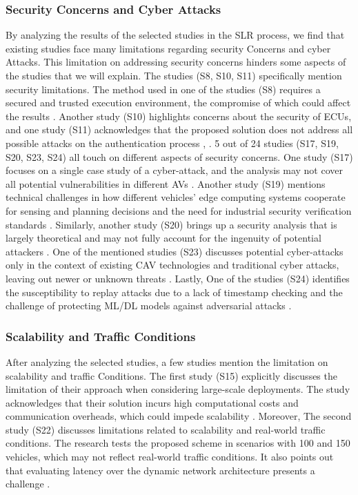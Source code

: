 \documentclass[a4paper,12pt]{article}
\begin{document}
\subsubsection{Security Concerns and Cyber Attacks}
\hspace{5mm} By analyzing the results of the selected studies in the SLR process, we find that existing studies face many limitations regarding security Concerns and cyber Attacks. This limitation on addressing security concerns hinders some aspects of the studies that we will explain. The studies (S8, S10, S11) specifically mention security limitations. The method used in one of the studies (S8) requires a secured and trusted execution environment, the compromise of which could affect the results \cite{s8}. Another study (S10) highlights concerns about the security of ECUs, and one study (S11) acknowledges that the proposed solution does not address all possible attacks on the authentication process \cite{s10}, \cite{s11}. 5 out of 24 studies (S17, S19, S20, S23, S24) all touch on different aspects of security concerns. One study (S17) focuses on a single case study of a cyber-attack, and the analysis may not cover all potential vulnerabilities in different AVs \cite{s17}. Another study (S19) mentions technical challenges in how different vehicles' edge computing systems cooperate for sensing and planning decisions and the need for industrial security verification standards \cite{s19}. Similarly, another study (S20) brings up a security analysis that is largely theoretical and may not fully account for the ingenuity of potential attackers \cite{s20}. One of the mentioned studies (S23) discusses potential cyber-attacks only in the context of existing CAV technologies and traditional cyber attacks, leaving out newer or unknown threats \cite{s23}. Lastly, One of the studies (S24) identifies the susceptibility to replay attacks due to a lack of timestamp checking and the challenge of protecting ML/DL models against adversarial attacks \cite{s24}.

\subsubsection{Scalability and Traffic Conditions}
\hspace{5mm} After analyzing the selected studies, a few studies mention the limitation on scalability and traffic Conditions. The first study (S15) explicitly discusses the limitation of their approach when considering large-scale deployments. The study acknowledges that their solution incurs high computational costs and communication overheads, which could impede scalability \cite{s15}. Moreover, The second study (S22) discusses limitations related to scalability and real-world traffic conditions. The research tests the proposed scheme in scenarios with 100 and 150 vehicles, which may not reflect real-world traffic conditions. It also points out that evaluating latency over the dynamic network architecture presents a challenge \cite{s22}.
\end{document}
